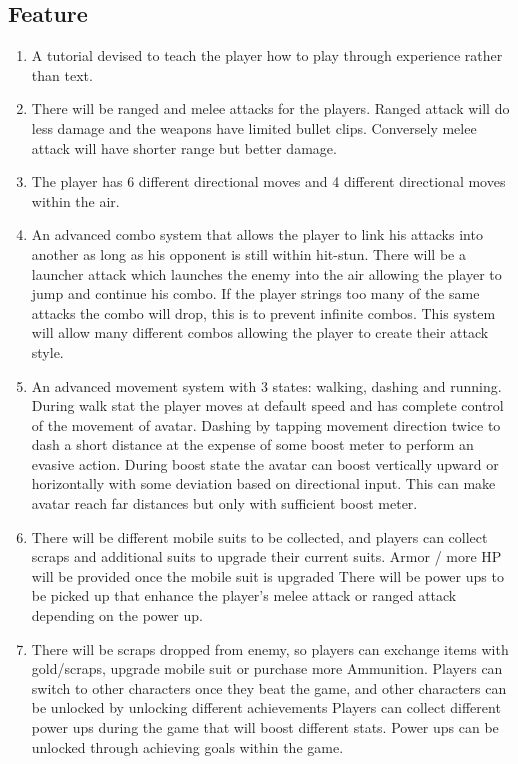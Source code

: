 \documentclass{article}
\begin{document}
\subsection*{Feature}
    \begin{enumerate}
        \item A tutorial devised to teach the player how to play through experience rather than text.
        \item There will be ranged  and melee attacks for the players. Ranged attack will do less damage and the weapons have limited bullet clips.  Conversely melee attack will have shorter range but better damage.
        \item The player has 6 different directional moves and 4 different directional moves within the air.
        \item An advanced combo system that allows the player to link his attacks into another as long as his opponent is still within hit-stun. There will be a launcher attack which launches the enemy into the air allowing the player to jump and continue his combo. If the player strings too many of the same attacks the combo will drop, this is to prevent infinite combos. This system will allow many different combos allowing the player to create their attack style.
        \item An advanced movement system with 3 states: walking, dashing and running. During walk stat the player moves at default speed and has complete control of the movement of avatar. Dashing by tapping movement direction twice to dash a short distance at the expense of some boost meter to perform an evasive action. During boost state the avatar can boost vertically upward or horizontally with some deviation based on directional input. This can make avatar reach far distances but only with sufficient boost meter.
        \item There will be different mobile suits to be collected, and players can collect scraps and additional suits to upgrade their current suits. Armor / more HP will be provided once the  mobile suit is upgraded
        There will be power ups to be picked up that enhance the player’s melee attack or ranged attack depending on the power up.
        \item There will be scraps dropped from enemy, so players can exchange items with gold/scraps, upgrade mobile suit or purchase more Ammunition.
        Players can switch to other characters once they beat the game, and other characters can be unlocked by unlocking different achievements
        Players can collect  different power ups  during the game that will boost different stats. Power ups can be unlocked through achieving goals within the game.

\end{enumerate}
\end{document}
